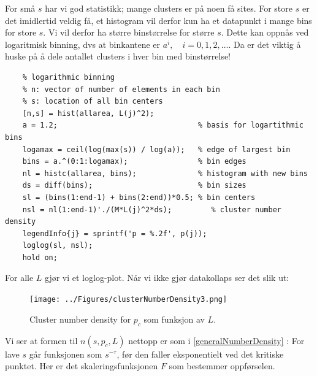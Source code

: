 \documentclass[english, a4paper]{article}
\begin{document}
For små $s$ har vi god statistikk; mange clusters er på noen få sites. For store $s$ er det imidlertid veldig få,
et histogram vil derfor kun ha et datapunkt i mange bins for store $s$. Vi vil derfor ha større binstørrelse
for større $s$. Dette kan oppnås ved logaritmisk binning, dvs at binkantene er $a^i, \quad i = 0, 1, 2, \dots$.
Da er det viktig å huske på å dele antallet clusters i hver bin med binstørrelse! 
\begin{lstlisting}
    % logarithmic binning
    % n: vector of number of elements in each bin
    % s: location of all bin centers
    [n,s] = hist(allarea, L(j)^2);
    a = 1.2;                                % basis for logartithmic bins
    logamax = ceil(log(max(s)) / log(a));   % edge of largest bin
    bins = a.^(0:1:logamax);                % bin edges
    nl = histc(allarea, bins);              % histogram with new bins
    ds = diff(bins);                        % bin sizes
    sl = (bins(1:end-1) + bins(2:end))*0.5; % bin centers
    nsl = nl(1:end-1)'./(M*L(j)^2*ds);         % cluster number density
    legendInfo{j} = sprintf('p = %.2f', p(j));
    loglog(sl, nsl);
    hold on;
\end{lstlisting}
For alle $L$ gjør vi et loglog-plot. Når vi ikke gjør datakollaps ser det slik ut:
\begin{figure}[H]
  \begin{center}
  \texttt{[image: ../Figures/clusterNumberDensity3.png]}
  \caption{Cluster number density for $p_c$ som funksjon av $L$.}
  \label{fig:fig1}
  \end{center}
\end{figure}
Vi ser at formen til $n(s,p_c,L)$ nettopp er som i \eqref{generalNumberDensity} : 
For lave $s$ går funksjonen som $s^{-\tau}$, før den faller eksponentielt
ved det kritiske punktet. Her er det skaleringsfunksjonen $F$ som bestemmer oppførselen. 
\end{document}
